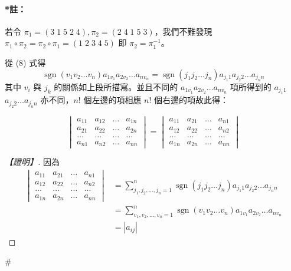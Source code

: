 \paragraph{*註：}若令 $\pi_1 = (3 \; 1 \; 5 \; 2 \; 4), \pi_2 = (2 \; 4 \; 1 \; 5 \; 3)$，我們不難發現 $\pi_1 \circ \pi_2 = \pi_2 \circ \pi_1 = (1 \; 2 \; 3 \; 4 \; 5)$ 即 $\pi_2 = \pi_1^{-1}$。

從 (8) 式得
\begin{equation}
\operatorname{sgn}(v_1 v_2 \dots v_n) a_{1v_1} a_{2v_2} \dots a_{nv_n} = \operatorname{sgn}(j_1 j_2 \dots j_n) a_{j_1 1} a_{j_2 2} \dots a_{j_n n} \label{eq:b6s-1-6-9}
\end{equation}
其中 $v_i$ 與 $j_k$ 的關係如上段所描寫。並且不同的 $a_{1v_1} a_{2v_2} \dots a_{nv_n}$ 項所得到的 $a_{j_1 1}$ $a_{j_2 2} \dots a_{j_n n}$ 亦不同，$n!$ 個左邊的項相應 $n!$ 個右邊的項故此得：

\begin{theorem}\label{thm:b6s-1-14}
\begin{equation}
\begin{vmatrix}
a_{11} & a_{12} & \dots & a_{1n} \\
a_{21} & a_{22} & \dots & a_{2n} \\
\dots & \dots & \dots & \dots \\
a_{n1} & a_{n2} & \dots & a_{nn}
\end{vmatrix} = \begin{vmatrix}
a_{11} & a_{21} & \dots & a_{n1} \\
a_{12} & a_{22} & \dots & a_{n2} \\
\dots & \dots & \dots & \dots \\
a_{1n} & a_{2n} & \dots & a_{nn}
\end{vmatrix} \label{eq:b6s-1-6-10}
\end{equation}
\end{theorem}

\begin{proof}[【證明】]
因為
\begin{align*}
\begin{vmatrix}
a_{11} & a_{21} & \dots & a_{n1} \\
a_{12} & a_{22} & \dots & a_{n2} \\
\dots & \dots & \dots & \dots \\
a_{1n} & a_{2n} & \dots & a_{nn}
\end{vmatrix} &= \sum_{j_1, j_2, \dots, j_n=1}^n \operatorname{sgn}(j_1 j_2 \dots j_n) a_{j_1 1} a_{j_2 2} \dots a_{j_n n} \\
&= \sum_{v_1, v_2, \dots, v_n=1}^n \operatorname{sgn}(v_1 v_2 \dots v_n) a_{1v_1} a_{2v_2} \dots a_{nv_n} \\
&= |a_{ij}|
\end{align*}
\end{proof}\hfill$\#$

